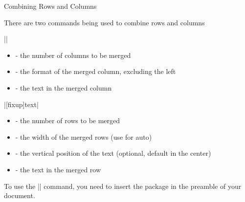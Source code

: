 \begin{frame}[fragile]{Combining Rows and Columns}

There are two commands being used to combine rows and columns
\begin{command}
\LC||

\begin{itemize}
	\item {} - the number of columns to be merged
	\item {} - the format of the merged column, excluding the left \packagename{|}
	\item {} - the text in the merged column
\end{itemize}

\LC|[fixup]{text}|

\begin{itemize}
	\item {} - the number of rows to be merged
	\item {} - the width of the merged rows (use \packagename{*} for auto)
	\item {} - the vertical position of the text (optional, default in the center)
	\item {} - the text in the merged row
\end{itemize}	

\end{command}

To use the \LC|\multirow| command, you need to insert the package  in the preamble of your document.

\end{frame}

